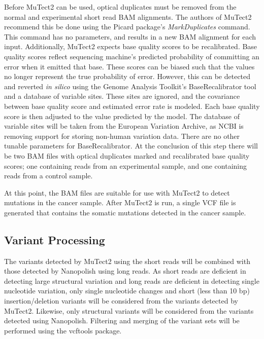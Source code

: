 Before MuTect2 can be used, optical duplicates must be removed from the normal and experimental short read BAM alignments. The authors of MuTect2 recommend this be done using the Picard package's \textit{MarkDuplicates} command. This command has no parameters, and results in a new BAM alignment for each input. Additionally, MuTect2 expects base quality scores to be recalibrated. Base quality scores reflect sequencing machine's predicted probability of committing an error when it emitted that base. These scores can be biased such that the values no longer represent the true probability of error. However, this can be detected and reverted \textit{in silico} using the Genome Analysis Toolkit's BaseRecalibrator tool and a database of variable sites. These sites are ignored, and the covariance between base quality score and estimated error rate is modeled. Each base quality score is then adjusted to the value predicted by the model. The database of variable sites will be taken from the European Variation Archive, as NCBI is removing support for storing non-human variation data. There are no other tunable parameters for BaseRecalibrator. At the conclusion of this step there will be two BAM files with optical duplicates marked and recalibrated base quality scores; one containing reads from an experimental sample, and one containing reads from a control sample.

At this point, the BAM files are suitable for use with MuTect2 to detect mutations in the cancer sample. After MuTect2 is run, a single VCF file is generated that contains the somatic mutations detected in the cancer sample.

\subsection{Variant Processing}
The variants detected by MuTect2 using the short reads will be combined with those detected by Nanopolish using long reads. As short reads are deficient in detecting large structural variation and long reads are deficient in detecting single nucleotide variation, only single nucleotide changes and short (less than 10 bp) insertion/deletion variants will be considered from the variants detected by MuTect2. Likewise, only structural variants will be considered from the variants detected using Nanopolish.
Filtering and merging of the variant sets will be performed using the vcftools package.

